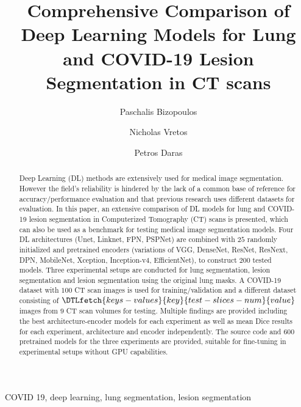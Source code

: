 \documentclass{elsarticle}
\providecommand{\FILEPATH}{.}
\begin{document}
\DTLloaddb{keys-values}{\FILEPATH/keys-values.csv}

\title{Comprehensive Comparison of Deep Learning Models for Lung and
COVID-19 Lesion Segmentation in CT scans}
\author[1]{Paschalis Bizopoulos}
\author[1]{Nicholas Vretos}
\author[1]{Petros Daras}

\address[1]{Visual Computing Lab of the Information Technologies
  Institute, Centre for Research and Technology Hellas, Thessaloniki,
Greece e-mail: pbizop@gmail.com,\{vretos,daras\}@iti.gr}

\begin{abstract}
  Deep Learning (DL) methods are extensively used for medical image
  segmentation.
  However the field's reliability is hindered by the lack of a common
  base of reference for accuracy/performance evaluation and that
  previous research uses different datasets for evaluation.
  In this paper, an extensive comparison of DL models for lung and
  COVID-19 lesion segmentation in Computerized Tomography (CT) scans
  is presented, which can also be used as a benchmark for testing
  medical image segmentation models.
  Four DL architectures (Unet, Linknet, FPN, PSPNet) are combined
  with $25$ randomly initialized and pretrained encoders (variations
    of VGG, DenseNet, ResNet, ResNext, DPN, MobileNet, Xception,
  Inception-v4, EfficientNet), to construct $200$ tested models.
  Three experimental setups are conducted for lung segmentation,
  lesion segmentation and lesion segmentation using the original lung masks.
  A COVID-19 dataset with $100$ CT scan images is used for
  training/validation and a different dataset consisting of
  $\DTLfetch{keys-values}{key}{test-slices-num}{value}$ images from
  $9$ CT scan volumes for testing.
  Multiple findings are provided including the best
  architecture-encoder models for each experiment as well as mean
  Dice results for each experiment, architecture and encoder independently.
  The source code and $600$ pretrained models for the three
  experiments are provided, suitable for fine-tuning in experimental
  setups without GPU capabilities.
\end{abstract}

\begin{keyword}
  COVID 19, deep learning, lung segmentation, lesion segmentation
\end{keyword}

\maketitle
\end{document}
